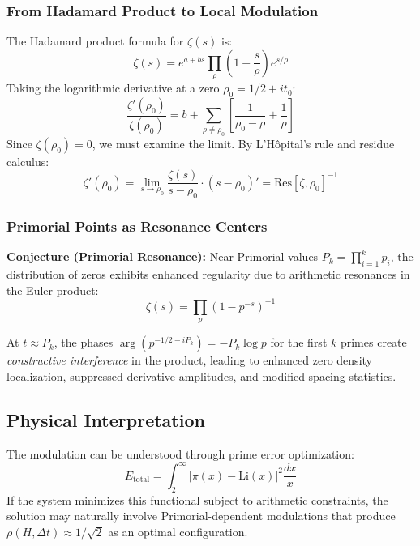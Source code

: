 \documentclass[12pt]{article}
\begin{document}
\subsubsection{From Hadamard Product to Local Modulation}

The Hadamard product formula for $\zeta(s)$ is:
%
\begin{equation}
\zeta(s) = e^{a+bs} \prod_{\rho} \left(1 - \frac{s}{\rho}\right) e^{s/\rho}
\end{equation}
%
Taking the logarithmic derivative at a zero $\rho_0 = 1/2 + it_0$:
%
\begin{equation}
\frac{\zeta'(\rho_0)}{\zeta(\rho_0)} = b + \sum_{\rho \neq \rho_0} \left[\frac{1}{\rho_0 - \rho} + \frac{1}{\rho}\right]
\end{equation}
%
Since $\zeta(\rho_0) = 0$, we must examine the limit. By L'Hôpital's rule and residue calculus:
%
\begin{equation}
\zeta'(\rho_0) = \lim_{s \to \rho_0} \frac{\zeta(s)}{s - \rho_0} \cdot (s - \rho_0)' = \text{Res}[\zeta, \rho_0]^{-1}
\end{equation}

\subsubsection{Primorial Points as Resonance Centers}

\textbf{Conjecture (Primorial Resonance):} Near Primorial values $P_k = \prod_{i=1}^k p_i$, the distribution of zeros exhibits enhanced regularity due to arithmetic resonances in the Euler product:
%
\begin{equation}
\zeta(s) = \prod_{p} (1 - p^{-s})^{-1}
\end{equation}

At $t \approx P_k$, the phases $\arg(p^{-1/2-iP_k}) = -P_k \log p$ for the first $k$ primes create \textit{constructive interference} in the product, leading to enhanced zero density localization, suppressed derivative amplitudes, and modified spacing statistics.

\subsection{Physical Interpretation}

The modulation can be understood through prime error optimization:
%
\begin{equation}
E_{\text{total}} = \int_2^{\infty} |\pi(x) - \text{Li}(x)|^2 \frac{dx}{x}
\end{equation}
%
If the system minimizes this functional subject to arithmetic
constraints, the solution may naturally involve Primorial-dependent
modulations that produce $\rho(H, \Delta t) \approx 1/\sqrt{2}$ as
an optimal configuration.
\end{document}
